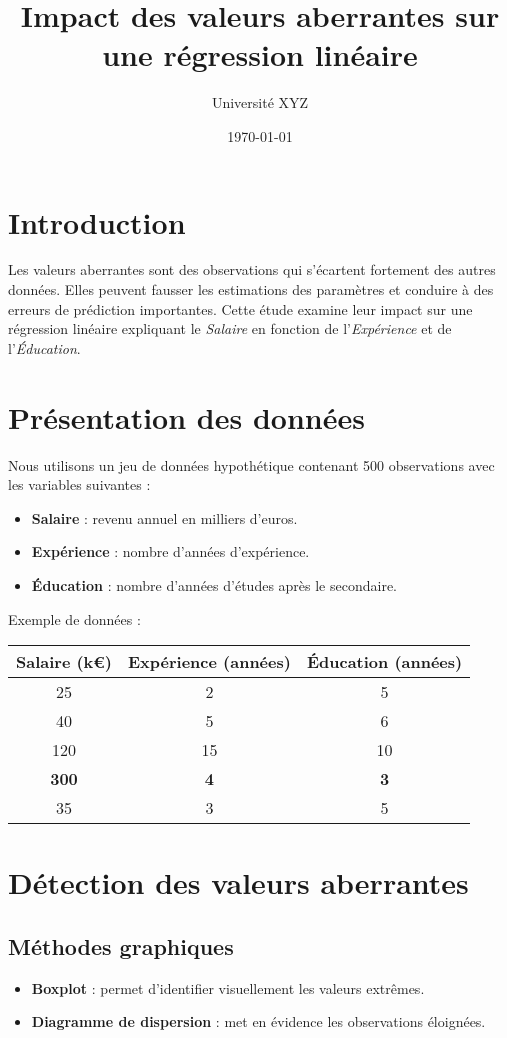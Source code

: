 \documentclass[a4paper,12pt]{article}
\title{\textbf{Impact des valeurs aberrantes sur une régression linéaire}}
\author{Université XYZ}
\date{\today}
\begin{document}
\maketitle

\section{Introduction}
Les valeurs aberrantes sont des observations qui s'écartent fortement des autres données. Elles peuvent fausser les estimations des paramètres et conduire à des erreurs de prédiction importantes. Cette étude examine leur impact sur une régression linéaire expliquant le \textit{Salaire} en fonction de l'\textit{Expérience} et de l'\textit{Éducation}.

\section{Présentation des données}
Nous utilisons un jeu de données hypothétique contenant 500 observations avec les variables suivantes :
\begin{itemize}
    \item \textbf{Salaire} : revenu annuel en milliers d'euros.
    \item \textbf{Expérience} : nombre d'années d'expérience.
    \item \textbf{Éducation} : nombre d'années d'études après le secondaire.
\end{itemize}

Exemple de données :
\begin{center}
    \begin{tabular}{ccc}
    \toprule
    Salaire (k€) & Expérience (années) & Éducation (années) \\
    \midrule
    25  & 2  & 5  \\
    40  & 5  & 6  \\
    120 & 15 & 10 \\
    \textbf{300} & \textbf{4} & \textbf{3} \\
    35  & 3  & 5  \\
    \bottomrule
    \end{tabular}
\end{center}

\section{Détection des valeurs aberrantes}

\subsection{Méthodes graphiques}
\begin{itemize}
    \item \textbf{Boxplot} : permet d'identifier visuellement les valeurs extrêmes.
    \item \textbf{Diagramme de dispersion} : met en évidence les observations éloignées.
\end{itemize}
\end{document}
